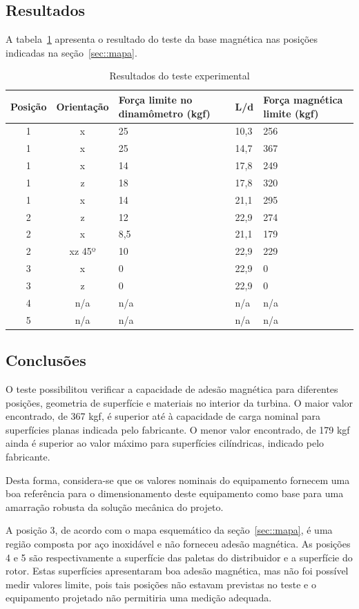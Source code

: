 \subsection{Resultados} \label{sec::resultados}
A tabela~\ref{table:1} apresenta o resultado do teste da base magnética nas
posições indicadas na seção~\ref{sec::mapa}.

\begin{table}[h!]
\centering
\begin{tabular}{||c c m{7em} m{4em} m{6em}||} 
 \hline
 Posição & Orientação & Força limite no dinamômetro (kgf) & L/d & Força
 magnética limite (kgf) \\  [0.5ex] 
 \hline\hline
 1 & x & 25 & 10,3 & 256 \\ 
 1 & x & 25 & 14,7 & 367 \\
 1 & x & 14 & 17,8 & 249 \\
 1 & z & 18 & 17,8 & 320 \\
 1 & x & 14 & 21,1 & 295 \\
 2 & z & 12 & 22,9 & 274 \\
 2 & x & 8,5 & 21,1 & 179 \\
 2 & xz 45º & 10 & 22,9 & 229 \\
 3 & x & 0 & 22,9 & 0 \\
 3 & z & 0 & 22,9 & 0 \\
 4 & n/a & n/a & n/a & n/a \\
 5 & n/a & n/a & n/a & n/a \\ [1ex]
 \hline
\end{tabular}
\caption{Resultados do teste experimental}
\label{table:1}
\end{table}


\subsection{Conclusões}
O teste possibilitou verificar a capacidade de adesão magnética para diferentes
posições, geometria de superfície e materiais no interior da turbina. O maior
valor encontrado, de 367 kgf, é superior até à capacidade de carga nominal para
superfícies planas indicada pelo fabricante. O menor valor encontrado, de 179
kgf ainda é superior ao valor máximo para superfícies cilíndricas, indicado pelo
fabricante.

Desta forma, considera-se que os valores nominais do equipamento fornecem uma
boa referência para o dimensionamento deste equipamento como base para uma
amarração robusta da solução mecânica do projeto.

A posição 3, de acordo com o mapa esquemático da seção~\ref{sec::mapa}, é uma
região composta por aço inoxidável e não forneceu adesão magnética. As posições
4 e 5 são respectivamente a superfície das paletas do distribuidor e a
superfície do rotor. Estas superfícies apresentaram boa adesão magnética, mas
não foi possível medir valores limite, pois tais posições não estavam previstas
no teste e o equipamento projetado não permitiria uma medição adequada.